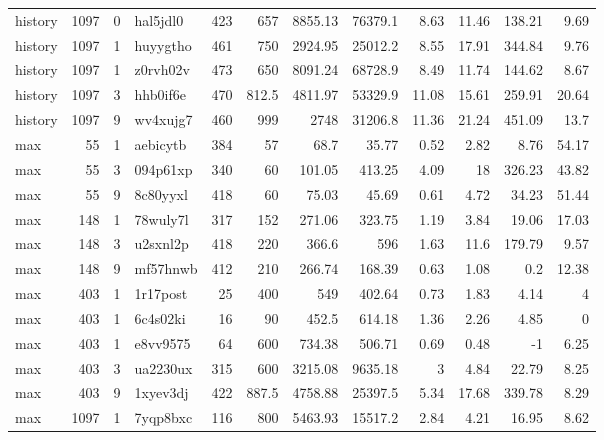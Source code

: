 \documentclass[9pt,a4paper,twocolumn,lineno]{article}
\begin{document}
\begin{table}
\begin{tabular}{lrrlrrrrrrrr}
 history  & 1097 &   0 & hal5jdl0 & 423 &    657   &  8855.13 & 76379.1  &  8.63 &  11.46 & 138.21 &         9.69 \\
 history  & 1097 &   1 & huyygtho & 461 &    750   &  2924.95 & 25012.2  &  8.55 &  17.91 & 344.84 &         9.76 \\
 history  & 1097 &   1 & z0rvh02v & 473 &    650   &  8091.24 & 68728.9  &  8.49 &  11.74 & 144.62 &         8.67 \\
 history  & 1097 &   3 & hhb0if6e & 470 &    812.5 &  4811.97 & 53329.9  & 11.08 &  15.61 & 259.91 &        20.64 \\
 history  & 1097 &   9 & wv4xujg7 & 460 &    999   &  2748    & 31206.8  & 11.36 &  21.24 & 451.09 &        13.7  \\
 max      &   55 &   1 & aebicytb & 384 &     57   &    68.7  &    35.77 &  0.52 &   2.82 &   8.76 &        54.17 \\
 max      &   55 &   3 & 094p61xp & 340 &     60   &   101.05 &   413.25 &  4.09 &  18    & 326.23 &        43.82 \\
 max      &   55 &   9 & 8c80yyxl & 418 &     60   &    75.03 &    45.69 &  0.61 &   4.72 &  34.23 &        51.44 \\
 max      &  148 &   1 & 78wuly7l & 317 &    152   &   271.06 &   323.75 &  1.19 &   3.84 &  19.06 &        17.03 \\
 max      &  148 &   3 & u2sxnl2p & 418 &    220   &   366.6  &   596    &  1.63 &  11.6  & 179.79 &         9.57 \\
 max      &  148 &   9 & mf57hnwb & 412 &    210   &   266.74 &   168.39 &  0.63 &   1.08 &   0.2  &        12.38 \\
 max      &  403 &   1 & 1r17post &  25 &    400   &   549    &   402.64 &  0.73 &   1.83 &   4.14 &         4    \\
 max      &  403 &   1 & 6c4s02ki &  16 &     90   &   452.5  &   614.18 &  1.36 &   2.26 &   4.85 &         0    \\
 max      &  403 &   1 & e8vv9575 &  64 &    600   &   734.38 &   506.71 &  0.69 &   0.48 &  -1    &         6.25 \\
 max      &  403 &   3 & ua2230ux & 315 &    600   &  3215.08 &  9635.18 &  3    &   4.84 &  22.79 &         8.25 \\
 max      &  403 &   9 & 1xyev3dj & 422 &    887.5 &  4758.88 & 25397.5  &  5.34 &  17.68 & 339.78 &         8.29 \\
 max      & 1097 &   1 & 7yqp8bxc & 116 &    800   &  5463.93 & 15517.2  &  2.84 &   4.21 &  16.95 &         8.62 \\

\end{tabular}
\end{table}
\end{document}
